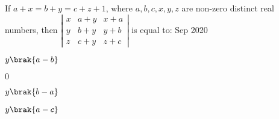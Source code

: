      \item If $a+x=b+y=c+z+1$, where $a, b, c, x, y, z$ are non-zero distinct real numbers, then  
    $\left| \begin{matrix} x & a+y & x+a \\ y & b+y & y+b \\z & c+y & z+c  \end{matrix} \right|$ is equal to:
	    \hfill{Sep 2020}
     \begin{enumerate}
      \begin{multicols}{4}
      \item $y\brak{a-b}$
      \item $0$
      \item $y\brak{b-a}$
      \item $y\brak{a-c}$
       \end{multicols}
      \end{enumerate}

      
